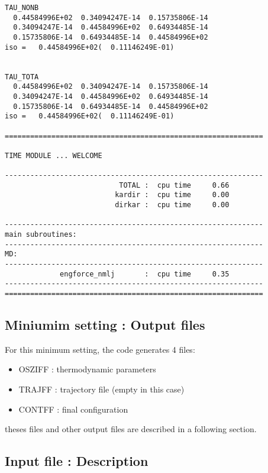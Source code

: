 \documentclass[a4paper]{article}
\begin{document}
\begin{verbatim}
TAU_NONB
  0.44584996E+02  0.34094247E-14  0.15735806E-14
  0.34094247E-14  0.44584996E+02  0.64934485E-14
  0.15735806E-14  0.64934485E-14  0.44584996E+02
iso =   0.44584996E+02(  0.11146249E-01)


TAU_TOTA
  0.44584996E+02  0.34094247E-14  0.15735806E-14
  0.34094247E-14  0.44584996E+02  0.64934485E-14
  0.15735806E-14  0.64934485E-14  0.44584996E+02
iso =   0.44584996E+02(  0.11146249E-01)

=============================================================

TIME MODULE ... WELCOME

-------------------------------------------------------------
                           TOTAL :  cpu time     0.66
                          kardir :  cpu time     0.00
                          dirkar :  cpu time     0.00

-------------------------------------------------------------
main subroutines:
-------------------------------------------------------------
MD:
-------------------------------------------------------------
             engforce_nmlj       :  cpu time     0.35
-------------------------------------------------------------
=============================================================
\end{verbatim}

\subsection{Miniumim setting : Output files}
For this minimum setting, the code generates 4 files:

\begin{itemize}
\item OSZIFF : thermodynamic parameters 
\item TRAJFF : trajectory file (empty in this case) 
\item CONTFF : final configuration
\end{itemize}
theses files and other output files are described in a following section.

\subsection{Input file : Description}

\end{document}
